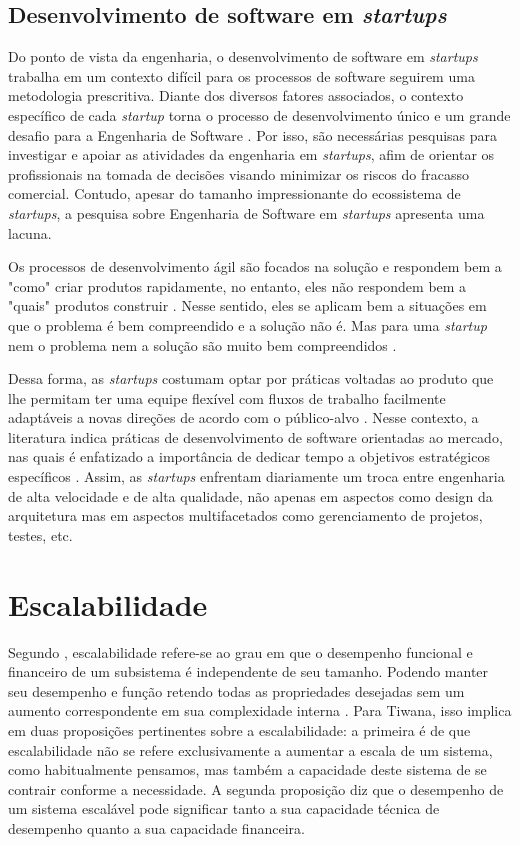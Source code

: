 \subsection{Desenvolvimento de software em \textit{startups}}

Do ponto de vista da engenharia, o desenvolvimento de software em \textit{startups}
trabalha em um contexto difícil para os processos de software seguirem uma metodologia
prescritiva. Diante dos diversos fatores associados, o contexto específico de cada
\textit{startup} torna o processo de desenvolvimento único e um grande desafio para
a Engenharia de Software \cite{Giardino2016}. Por isso, são necessárias pesquisas para
investigar e apoiar as atividades da engenharia em \textit{startups}, afim de orientar
os profissionais na tomada de decisões visando minimizar os riscos do fracasso
comercial. Contudo, apesar do tamanho impressionante do ecossistema de
\textit{startups}, a pesquisa sobre Engenharia de Software em \textit{startups}
apresenta uma lacuna\cite{Giardino2016}.

Os processos de desenvolvimento ágil são focados na solução e respondem bem a
"como" criar produtos rapidamente, no entanto, eles não respondem bem a "quais"
produtos construir \cite{Bosch2013}. Nesse sentido, eles se aplicam bem a situações
em que o problema é bem compreendido e a solução não é. Mas para uma \textit{startup}
nem o problema nem a solução são muito bem compreendidos \cite{Bosch2013}.

Dessa forma, as \textit{startups} costumam optar por práticas voltadas ao produto que
lhe permitam ter uma equipe flexível com fluxos de trabalho facilmente
adaptáveis a novas direções de acordo com o público-alvo \cite{Paternoster2014}.
Nesse contexto, a literatura indica práticas de desenvolvimento de software
orientadas ao mercado, nas quais é enfatizado a importância de dedicar tempo
a objetivos estratégicos específicos \cite{Paternoster2014}. Assim, as
\textit{startups} enfrentam diariamente um troca entre engenharia de alta
velocidade e de alta qualidade, não apenas em aspectos como design da arquitetura
mas em aspectos multifacetados como gerenciamento de projetos, testes, etc.
\cite{Giardino2016}

\section{Escalabilidade}

Segundo , escalabilidade refere-se ao grau em que
o desempenho funcional e financeiro de um subsistema é independente de seu tamanho.
Podendo manter seu desempenho e função retendo todas as propriedades desejadas sem
um aumento correspondente em sua complexidade interna
. Para Tiwana, isso implica em duas
proposições pertinentes sobre a escalabilidade: a primeira é de que escalabilidade não
se refere exclusivamente a aumentar a escala de um sistema, como habitualmente
pensamos, mas também a capacidade deste sistema de se contrair conforme a necessidade.
A segunda proposição diz que o desempenho de um sistema escalável pode significar
tanto a sua capacidade técnica de desempenho quanto a sua capacidade financeira.

